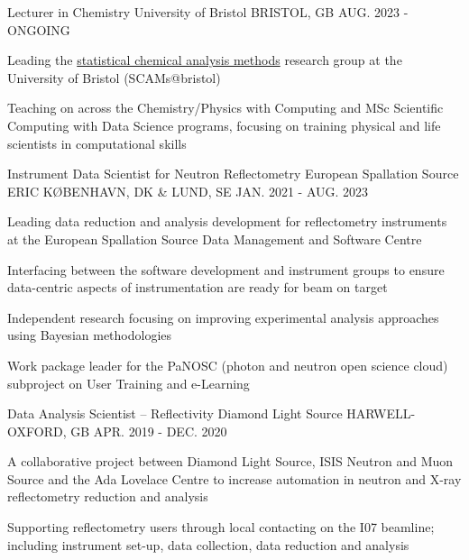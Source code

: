 \begin{cventries}
  \cventry
    {Lecturer in Chemistry}
    {University of Bristol}
    {BRISTOL, GB}
    {AUG. 2023 - ONGOING}
    {
      \begin{cvitems}
        \item {Leading the \href{https://scams-research.github.io}{statistical chemical analysis methods} research group at the University of Bristol (SCAMs@bristol)}
        \item {Teaching on across the Chemistry/Physics with Computing and MSc Scientific Computing with Data Science programs, focusing on training physical and life scientists in computational skills}
      \end{cvitems}
    }
  \cventry
    {Instrument Data Scientist for Neutron Reflectometry}
    {European Spallation Source ERIC}
    {K\O BENHAVN, DK \& LUND, SE}
    {JAN. 2021 - AUG. 2023}
    {
      \begin{cvitems}
        \item {Leading data reduction and analysis development for reflectometry instruments at the European Spallation Source Data Management and Software Centre}
        \item {Interfacing between the software development and instrument groups to ensure data-centric aspects of instrumentation are ready for beam on target}
        \item {Independent research focusing on improving experimental analysis approaches using Bayesian methodologies}
        \item {Work package leader for the PaNOSC (photon and neutron open science cloud) subproject on User Training and e-Learning}
      \end{cvitems}
    }
  \cventry
    {Data Analysis Scientist -- Reflectivity}
    {Diamond Light Source}
    {HARWELL-OXFORD, GB}
    {APR. 2019 - DEC. 2020}
    {
      \begin{cvitems}
        \item {A collaborative project between Diamond Light Source, ISIS Neutron and Muon Source and the Ada Lovelace Centre to increase automation in neutron and X-ray reflectometry reduction and analysis}
        \item {Supporting reflectometry users through local contacting on the I07 beamline; including instrument set-up, data collection, data reduction and analysis}
      \end{cvitems}
    }
\end{cventries}
